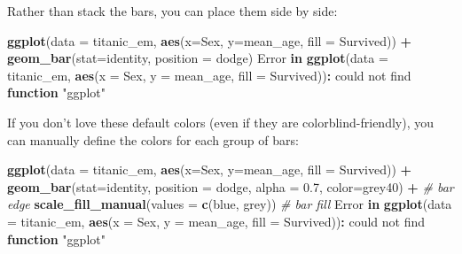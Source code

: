 \documentclass[
]{book}
\newenvironment{Shaded}{\begin{snugshade}}{\end{snugshade}}
\newcommand{\AttributeTok}[1]{\textcolor[rgb]{0.13,0.29,0.53}{#1}}
\newcommand{\CommentTok}[1]{\textcolor[rgb]{0.56,0.35,0.01}{\textit{#1}}}
\newcommand{\ControlFlowTok}[1]{\textcolor[rgb]{0.13,0.29,0.53}{\textbf{#1}}}
\newcommand{\FloatTok}[1]{\textcolor[rgb]{0.00,0.00,0.81}{#1}}
\newcommand{\FunctionTok}[1]{\textcolor[rgb]{0.13,0.29,0.53}{\textbf{#1}}}
\newcommand{\NormalTok}[1]{#1}
\newcommand{\SpecialCharTok}[1]{\textcolor[rgb]{0.81,0.36,0.00}{\textbf{#1}}}
\newcommand{\StringTok}[1]{\textcolor[rgb]{0.31,0.60,0.02}{#1}}
\begin{document}
Rather than stack the bars, you can place them side by side:

\begin{Shaded}
\begin{Highlighting}[]
\FunctionTok{ggplot}\NormalTok{(}\AttributeTok{data =}\NormalTok{ titanic\_em, }
       \FunctionTok{aes}\NormalTok{(}\AttributeTok{x=}\NormalTok{Sex, }\AttributeTok{y=}\NormalTok{mean\_age, }\AttributeTok{fill =}\NormalTok{ Survived)) }\SpecialCharTok{+}
  \FunctionTok{geom\_bar}\NormalTok{(}\AttributeTok{stat=}\StringTok{\textquotesingle{}identity\textquotesingle{}}\NormalTok{, }\AttributeTok{position =} \StringTok{\textquotesingle{}dodge\textquotesingle{}}\NormalTok{) }
\NormalTok{Error }\ControlFlowTok{in} \FunctionTok{ggplot}\NormalTok{(}\AttributeTok{data =}\NormalTok{ titanic\_em, }\FunctionTok{aes}\NormalTok{(}\AttributeTok{x =}\NormalTok{ Sex, }\AttributeTok{y =}\NormalTok{ mean\_age, }\AttributeTok{fill =}\NormalTok{ Survived))}\SpecialCharTok{:}\NormalTok{ could not find }\ControlFlowTok{function} \StringTok{"ggplot"}
\end{Highlighting}
\end{Shaded}

If you don't love these default colors (even if they are colorblind-friendly), you can manually define the colors for each group of bars:

\begin{Shaded}
\begin{Highlighting}[]
\FunctionTok{ggplot}\NormalTok{(}\AttributeTok{data =}\NormalTok{ titanic\_em, }
       \FunctionTok{aes}\NormalTok{(}\AttributeTok{x=}\NormalTok{Sex, }\AttributeTok{y=}\NormalTok{mean\_age, }\AttributeTok{fill =}\NormalTok{ Survived)) }\SpecialCharTok{+}
  \FunctionTok{geom\_bar}\NormalTok{(}\AttributeTok{stat=}\StringTok{\textquotesingle{}identity\textquotesingle{}}\NormalTok{, }
           \AttributeTok{position =} \StringTok{\textquotesingle{}dodge\textquotesingle{}}\NormalTok{, }
           \AttributeTok{alpha =} \FloatTok{0.7}\NormalTok{, }
           \AttributeTok{color=}\StringTok{\textquotesingle{}grey40\textquotesingle{}}\NormalTok{) }\SpecialCharTok{+} \CommentTok{\# bar edge}
  \FunctionTok{scale\_fill\_manual}\NormalTok{(}\AttributeTok{values =} \FunctionTok{c}\NormalTok{(}\StringTok{\textquotesingle{}blue\textquotesingle{}}\NormalTok{, }\StringTok{\textquotesingle{}grey\textquotesingle{}}\NormalTok{)) }\CommentTok{\# bar fill}
\NormalTok{Error }\ControlFlowTok{in} \FunctionTok{ggplot}\NormalTok{(}\AttributeTok{data =}\NormalTok{ titanic\_em, }\FunctionTok{aes}\NormalTok{(}\AttributeTok{x =}\NormalTok{ Sex, }\AttributeTok{y =}\NormalTok{ mean\_age, }\AttributeTok{fill =}\NormalTok{ Survived))}\SpecialCharTok{:}\NormalTok{ could not find }\ControlFlowTok{function} \StringTok{"ggplot"}
\end{Highlighting}
\end{Shaded}
\end{document}
